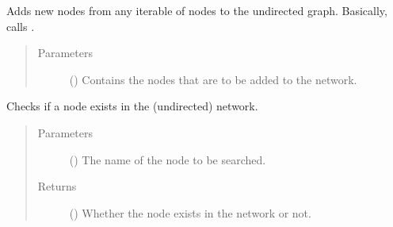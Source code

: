 \documentclass[letterpaper,10pt,english]{sphinxmanual}
\begin{document}
\begin{fulllineitems}
\begin{fulllineitems}
\end{fulllineitems}


\begin{fulllineitems}
\label{\detokenize{reference:pypath.main.PyPath.new_nodes}}
Adds new nodes from any iterable of nodes to the undirected
graph. Basically, calls .
\begin{quote}\begin{description}
\item[{Parameters}] \leavevmode
{} () \textendash{} Contains the nodes that are to be added to the network.

\end{description}\end{quote}

\end{fulllineitems}


\begin{fulllineitems}
\label{\detokenize{reference:pypath.main.PyPath.node_exists}}
Checks if a node exists in the (undirected) network.
\begin{quote}\begin{description}
\item[{Parameters}] \leavevmode
{} () \textendash{} The name of the node to be searched.

\item[{Returns}] \leavevmode
() \textendash{} Whether the node exists in the network or not.

\end{description}\end{quote}

\end{fulllineitems}



\end{fulllineitems}
\end{document}
